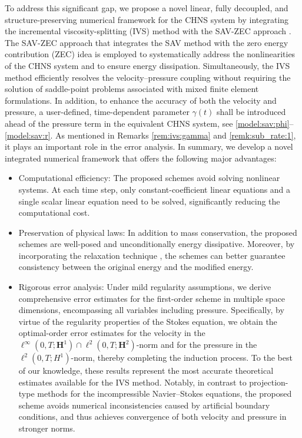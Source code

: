 To address this significant gap, we propose a novel linear, fully decoupled, and structure-preserving numerical framework for the CHNS system by integrating the incremental viscosity-splitting (IVS) method \cite{yakoubi2023enhancing} with the SAV-ZEC approach \cite{zgdsisc2024}.  The SAV-ZEC approach that integrates the SAV method with the zero energy contribution (ZEC) idea \cite{chen2021fully,yang2021novelSISC} is employed to systematically address the nonlinearities of the CHNS system and to ensure energy dissipation. Simultaneously, the IVS method efficiently resolves the velocity–pressure coupling without requiring the solution of saddle-point problems associated with mixed finite element formulations. In addition, to enhance the accuracy of both the velocity and pressure, a user-defined, time-dependent parameter $\gamma(t)$ shall be introduced ahead of the pressure term in the equivalent CHNS system, see \eqref{model:sav:phi}--\eqref{model:sav:r}. As mentioned in Remarks \ref{rem:ivs:gamma} and \ref{remk:sub_rate:1}, it plays an important role in the error analysis.
In summary, we develop a novel integrated numerical framework that offers the following major advantages:
\begin{itemize} 
	\item Computational efficiency: The proposed schemes avoid solving nonlinear systems. At each time step, only constant-coefficient linear equations and a single scalar linear equation need to be solved, significantly reducing the computational cost.
	
	\item Preservation of physical laws: In addition to mass conservation, the proposed schemes are well-posed and unconditionally energy dissipative. 
	Moreover, by incorporating the relaxation technique \cite{jiang2022improving}, the schemes can better guarantee consistency between the original energy and the modified energy.
	
	\item Rigorous error analysis: 
	Under mild regularity assumptions, we derive comprehensive error estimates for the first-order scheme in multiple space dimensions, encompassing all variables including pressure. Specifically, by virtue of the regularity properties of the Stokes equation, we obtain the optimal-order error estimates for the velocity in the $\ell^{\infty}(0,T; \bm H^1) \cap \ell^{2}(0,T; \bm H^2) $-norm and for the pressure in the $\ell^{2}(0,T; H^1)$-norm, thereby completing the induction process. To the best of our knowledge, these results represent the most accurate theoretical estimates available for the IVS method.  Notably, in contrast to projection-type methods for the incompressible Navier–Stokes equations, the proposed scheme avoids numerical inconsistencies caused by artificial boundary conditions, and thus achieves convergence of both velocity and pressure in stronger norms.
\end{itemize}

